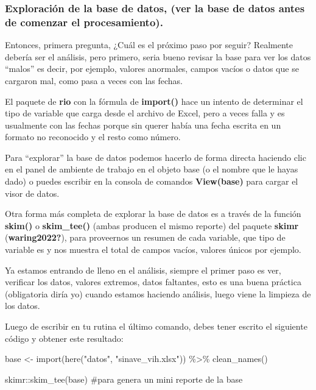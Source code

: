 \documentclass[
  letterpaper,
  DIV=11,
  numbers=noendperiod]{scrreprt}
\newenvironment{Shaded}{\begin{snugshade}}{\end{snugshade}}
\newcommand{\CommentTok}[1]{\textcolor[rgb]{0.37,0.37,0.37}{#1}}
\newcommand{\FunctionTok}[1]{\textcolor[rgb]{0.28,0.35,0.67}{#1}}
\newcommand{\NormalTok}[1]{\textcolor[rgb]{0.00,0.23,0.31}{#1}}
\newcommand{\OtherTok}[1]{\textcolor[rgb]{0.00,0.23,0.31}{#1}}
\newcommand{\SpecialCharTok}[1]{\textcolor[rgb]{0.37,0.37,0.37}{#1}}
\newcommand{\StringTok}[1]{\textcolor[rgb]{0.13,0.47,0.30}{#1}}
\begin{document}
\subsubsection{\texorpdfstring{\textbf{Exploración de la base de datos,
(ver la base de datos antes de comenzar el
procesamiento).}}{Exploración de la base de datos, (ver la base de datos antes de comenzar el procesamiento).}}\label{exploraciuxf3n-de-la-base-de-datos-ver-la-base-de-datos-antes-de-comenzar-el-procesamiento.}

Entonces, primera pregunta, ¿Cuál es el próximo paso por seguir?
Realmente debería ser el análisis, pero primero, seria bueno revisar la
base para ver los datos ``malos'' es decir, por ejemplo, valores
anormales, campos vacíos o datos que se cargaron mal, como pasa a veces
con las fechas.

El paquete de \textbf{rio} con la fórmula de \textbf{import()} hace un
intento de determinar el tipo de variable que carga desde el archivo de
Excel, pero a veces falla y es usualmente con las fechas porque sin
querer había una fecha escrita en un formato no reconocido y el resto
como número.

Para ``explorar'' la base de datos podemos hacerlo de forma directa
haciendo clic en el panel de ambiente de trabajo en el objeto base (o el
nombre que le hayas dado) o puedes escribir en la consola de comandos
\textbf{View(base)} para cargar el visor de datos.

Otra forma más completa de explorar la base de datos es a través de la
función \textbf{skim()} o \textbf{skim\_tee()} (ambas producen el mismo
reporte) del paquete \textbf{skimr} (\textbf{waring2022?}), para
proveernos un resumen de cada variable, que tipo de variable es y nos
muestra el total de campos vacíos, valores únicos por ejemplo.

Ya estamos entrando de lleno en el análisis, siempre el primer paso es
ver, verificar los datos, valores extremos, datos faltantes, esto es una
buena práctica (obligatoria diría yo) cuando estamos haciendo análisis,
luego viene la limpieza de los datos.

Luego de escribir en tu rutina el último comando, debes tener escrito el
siguiente código y obtener este resultado:

\begin{Shaded}
\begin{Highlighting}[]
\NormalTok{base }\OtherTok{\textless{}{-}} \FunctionTok{import}\NormalTok{(}\FunctionTok{here}\NormalTok{(}\StringTok{"datos"}\NormalTok{, }\StringTok{"sinave\_vih.xlsx"}\NormalTok{)) }\SpecialCharTok{\%\textgreater{}\%} 
  \FunctionTok{clean\_names}\NormalTok{()}

\NormalTok{skimr}\SpecialCharTok{::}\FunctionTok{skim\_tee}\NormalTok{(base) }\CommentTok{\#para genera un mini reporte de la base}
\end{Highlighting}
\end{Shaded}
\end{document}
